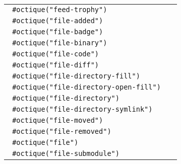 \begin{longtable}[]{@{}lc@{}}
\texttt{\ \#octique("feed-trophy")\ } &
\pandocbounded{} \\
\texttt{\ \#octique("file-added")\ } &
\pandocbounded{} \\
\texttt{\ \#octique("file-badge")\ } &
\pandocbounded{} \\
\texttt{\ \#octique("file-binary")\ } &
\pandocbounded{} \\
\texttt{\ \#octique("file-code")\ } &
\pandocbounded{} \\
\texttt{\ \#octique("file-diff")\ } &
\pandocbounded{} \\
\texttt{\ \#octique("file-directory-fill")\ } &
\pandocbounded{} \\
\texttt{\ \#octique("file-directory-open-fill")\ } &
\pandocbounded{} \\
\texttt{\ \#octique("file-directory")\ } &
\pandocbounded{} \\
\texttt{\ \#octique("file-directory-symlink")\ } &
\pandocbounded{} \\
\texttt{\ \#octique("file-moved")\ } &
\pandocbounded{} \\
\texttt{\ \#octique("file-removed")\ } &
\pandocbounded{} \\
\texttt{\ \#octique("file")\ } &
\pandocbounded{} \\
\texttt{\ \#octique("file-submodule")\ } &

\end{longtable}
